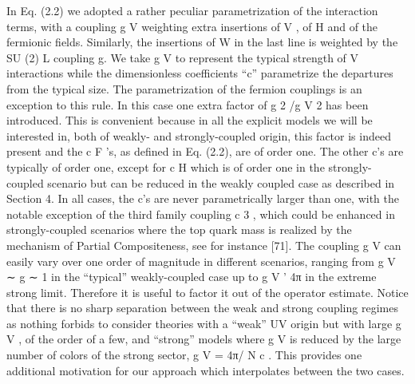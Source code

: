 
In Eq. (2.2) we adopted a rather peculiar parametrization of the interaction terms, with a
coupling g V weighting extra insertions of V , of H and of the fermionic fields. Similarly, the
insertions of W in the last line is weighted by the SU (2) L coupling g. We take g V to represent
the typical strength of V interactions while the dimensionless coefficients “c” parametrize the
departures from the typical size. The parametrization of the fermion couplings is an exception
to this rule. In this case one extra factor of g 2 /g V 2 has been introduced. This is convenient
because in all the explicit models we will be interested in, both of weakly- and strongly-coupled
origin, this factor is indeed present and the c F ’s, as defined in Eq. (2.2), are of order one. The
other c’s are typically of order one, except for c H which is of order one in the strongly-coupled
scenario but can be reduced in the weakly coupled case as described in Section 4. In all cases,
the c’s are never parametrically larger than one, with the notable exception of the third family
coupling c 3 , which could be enhanced in strongly-coupled scenarios where the top quark mass
is realized by the mechanism of Partial Compositeness, see for instance [71]. The coupling g V
can easily vary over one order of magnitude in different scenarios, ranging from g V ∼ g ∼ 1
in the “typical” weakly-coupled case up to g V ' 4π in the extreme strong limit. Therefore
it is useful to factor it out of the operator estimate. Notice that there is no sharp separation
between the weak and strong coupling regimes as nothing forbids to consider theories with a
“weak” UV origin but with large g V , of the order of a few, and “strong” models where g V is
reduced by the large number of colors of the strong sector, g V = 4π/ N c . This provides one
additional motivation for our approach which interpolates between the two cases.





